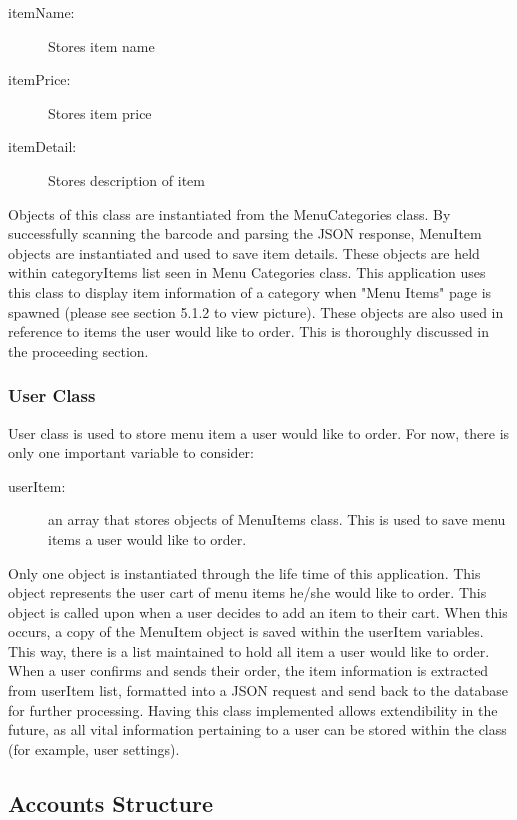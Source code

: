 \documentclass[12pt, titlepage]{article}
\begin{document}
\begin{description}
  \item[itemName:] Stores item name
  \item[itemPrice:] Stores item price
  \item[itemDetail:] Stores description of item
\end{description}

Objects of this class are instantiated from the MenuCategories class. By successfully scanning the barcode and parsing the JSON response, MenuItem objects are instantiated and used to save item details. These objects are held within categoryItems list seen in Menu Categories class. This application uses this class to display item information of a category when "Menu Items" page is spawned (please see section 5.1.2 to view picture). These objects are also used in reference to items the user would like to order. This is thoroughly discussed in the proceeding section.  

\subsubsection{User Class}
User class is used to store menu item a user would like to order. For now, there is only one important variable to consider: 

 \begin{description}
  \item[userItem:] an array that stores objects of MenuItems class. This is used to save menu items a user would like to order.
\end{description}

Only one object is instantiated through the life time of this application. This object represents the user cart of menu items he/she would like to order. This object is called upon when a user decides to add an item to their cart. When this occurs, a copy of the MenuItem object is saved within the userItem variables. This way, there is a list maintained to hold all item a user would like to order. When a user confirms and sends their order, the item information is extracted from userItem list, formatted into a JSON request and send back to the database for further processing. Having this class implemented allows extendibility in the future, as all vital information pertaining to a user can be stored within the class (for example, user settings).  

\subsection{Accounts Structure}
\end{document}
